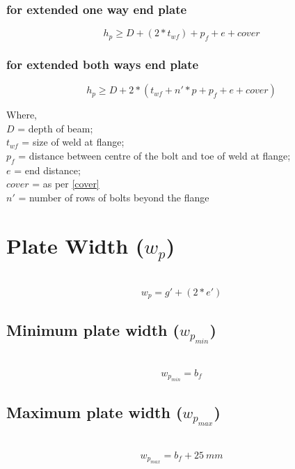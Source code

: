 \documentclass[11.5pt,a4paper,oneside]{report}
\begin{document}
\begin{Form}
	\subsubsection{for extended one way end plate}
	\begin{equation}
	h_p \ge D + (2 * t_{wf}) + p_f + e + cover
	\end{equation}
	
	\subsubsection{for extended both ways end plate}
	\begin{equation}
	h_p \ge D + 2 * (t_{wf} + n'*p + p_f + e + cover)
	\end{equation}
				
		Where, \\
	\indent $D$ = depth of beam; \\
	\indent $t_{wf}$ = size of weld at flange; \\
	\indent $p_f$ =  distance between centre of the bolt and toe of weld at flange;\\
	\indent $e$ = end distance; \\
	\indent $cover$ = as per \ref{cover}\\
	\indent $n'$ = number of rows of bolts beyond the flange

\section{Plate Width (\boldmath $w_p$)}
\qquad {} \\
	\begin{equation}
		w_p = g' + (2 * e')
	\end{equation}

\subsection{Minimum plate width (\boldmath $w_{p_{min}}$)} 
\qquad {} \\
	\begin{equation}
		w_{p_{min}} = b_f
	\end{equation}

\subsection{Maximum plate width (\boldmath $w_{p_{max}}$)}
\qquad {} \\
	\begin{equation}
		w_{p_{max}} = b_f + 25~mm
	\end{equation}
			



\end{Form}
\end{document}
